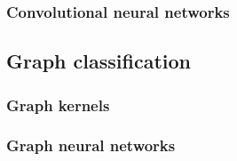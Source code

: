         \subsubsection{Convolutional neural networks}
    \subsection{Graph classification}
        \label{subsec::state_of_the_art::mlpr::graph_classification}

        \subsubsection{Graph kernels}
        \subsubsection{Graph neural networks}
